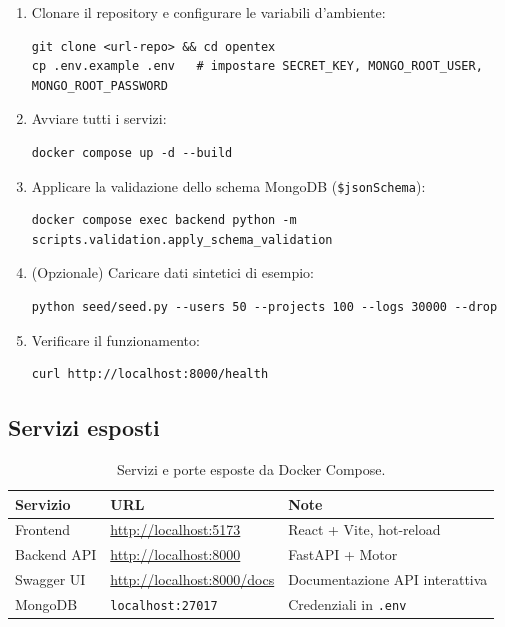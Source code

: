 \documentclass[11pt,a4paper]{article}
\begin{document}
\begin{enumerate}[leftmargin=2.2em]
  \item Clonare il repository e configurare le variabili d'ambiente:
\begin{lstlisting}
git clone <url-repo> && cd opentex
cp .env.example .env   # impostare SECRET_KEY, MONGO_ROOT_USER, MONGO_ROOT_PASSWORD
\end{lstlisting}
  \item Avviare tutti i servizi:
\begin{lstlisting}
docker compose up -d --build
\end{lstlisting}
  \item Applicare la validazione dello schema MongoDB (\texttt{\$jsonSchema}):
\begin{lstlisting}
docker compose exec backend python -m scripts.validation.apply_schema_validation
\end{lstlisting}
  \item (Opzionale) Caricare dati sintetici di esempio:
\begin{lstlisting}
python seed/seed.py --users 50 --projects 100 --logs 30000 --drop
\end{lstlisting}
  \item Verificare il funzionamento:
\begin{lstlisting}
curl http://localhost:8000/health
\end{lstlisting}
\end{enumerate}

\subsection{Servizi esposti}

\begin{table}[h!]
\centering
\begin{tabular}{@{}lll@{}}
\toprule
\textbf{Servizio} & \textbf{URL} & \textbf{Note} \\
\midrule
Frontend & \url{http://localhost:5173} & React + Vite, hot-reload \\
Backend API & \url{http://localhost:8000} & FastAPI + Motor \\
Swagger UI & \url{http://localhost:8000/docs} & Documentazione API interattiva \\
MongoDB & \texttt{localhost:27017} & Credenziali in \texttt{.env} \\
\bottomrule
\end{tabular}
\caption{Servizi e porte esposte da Docker Compose.}
\end{table}
\end{document}

